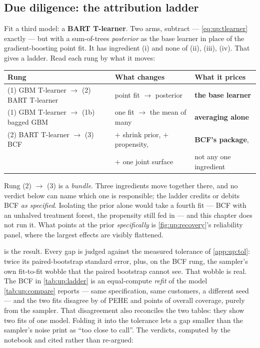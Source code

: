 \subsection*{Due diligence: the attribution ladder}

Fit a third model: a \textbf{BART T-learner}. Two arms, subtract --- \cref{eq:up:tlearner} exactly ---
but with a sum-of-trees \emph{posterior} as the base learner in place of the gradient-boosting point
fit. It has ingredient (i) and none of (ii), (iii), (iv). That gives a ladder. Read each rung by what
it moves:

\begin{center}\small
\begin{tabular}{@{}lll@{}}
\toprule
\textbf{Rung} & \textbf{What changes} & \textbf{What it prices} \\
\midrule
(1) GBM T-learner $\to$ (2) BART T-learner
  & point fit $\to$ posterior
  & \textbf{the base learner} \\
(1) GBM T-learner $\to$ (1b) bagged GBM
  & one fit $\to$ the mean of many
  & \textbf{averaging alone} \\
(2) BART T-learner $\to$ (3) BCF
  & $+$ shrink prior, $+$ propensity,
  & \textbf{BCF's package}, \\
  & $+$ one joint surface
  & not any one ingredient \\
\bottomrule
\end{tabular}
\end{center}

Rung (2) $\to$ (3) is a \emph{bundle}. Three ingredients move together there, and no verdict below can
name which one is responsible; the ladder credits or debits BCF \emph{as specified}. Isolating the
prior alone would take a fourth fit --- BCF with an unhalved treatment forest, the propensity still
fed in --- and this chapter does not run it. What points at the prior \emph{specifically} is
\cref{fig:up:recovery}'s reliability panel, where the largest effects are visibly flattened.



 is the result. Every gap is judged against the measured tolerance of
\cref{app:up:tol}: twice its paired-bootstrap standard error, plus, on the BCF rung, the sampler's own
fit-to-fit wobble that the paired bootstrap cannot see. That wobble is real. The BCF in
\cref{tab:up:ladder} is an equal-compute \emph{refit} of the model \cref{tab:up:compare} reports ---
same specification, same customers, a different seed --- and the two fits disagree by
\eur{\nbOneBcfSeedPeheWobble} of PEHE and \nbOneBcfSeedCovWobble{} points of overall coverage, purely
from the sampler. That disagreement also reconciles the two tables: they show two fits of one model.
Folding it into the tolerance lets a gap smaller than the sampler's noise print as ``too close to
call''. The verdicts, computed by the notebook and cited rather than re-argued:

